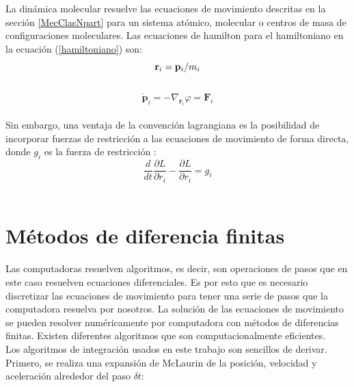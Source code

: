 La dinámica molecular resuelve las ecuaciones de movimiento descritas en la sección \ref{MecClasNpart} para un sistema atómico, molecular o centros de masa de configuraciones moleculares. Las ecuaciones de hamilton para el hamiltoniano en la ecuación (\ref{hamiltoniano}) son:\\

\begin{equation}
    \mathbf{r}_i = \mathbf{p}_i/m_i \\
\end{equation}\\
\begin{equation}
    \mathbf{\dot p}_i = -\nabla_{\mathbf{r}_i} \varphi = \mathbf{F}_i
\end{equation}\\

Sin embargo, una ventaja de la convención lagrangiana es la posibilidad de incorporar fuerzas de restricción a las ecuaciones de movimiento de forma directa, donde $g_i$ es la fuerza de restricción \cite{raabe2017}:\\

\begin{equation} \label{lagrangeeqconstraint}
    \frac{d}{dt}\frac{\partial L}{\partial \dot r_i} - \frac{\partial L}{\partial r_i} = g_i
\end{equation}\\

\section{Métodos de diferencia finitas}

Las computadoras resuelven algoritmos, es decir, son operaciones de pasos que en este caso resuelven ecuaciones diferenciales. Es por esto que es necesario discretizar las ecuaciones de movimiento para tener una serie de pasos que la computadora resuelva por nosotros. La solución de las ecuaciones de movimiento se pueden resolver numéricamente por computadora con métodos de diferencias finitas. Existen diferentes algoritmos que son computacionalmente eficientes.\\

Los algoritmos de integración usados en este trabajo son sencillos de derivar. Primero, se realiza una expansión de McLaurin de la posición, velocidad y aceleración alrededor del paso $\delta t$:

